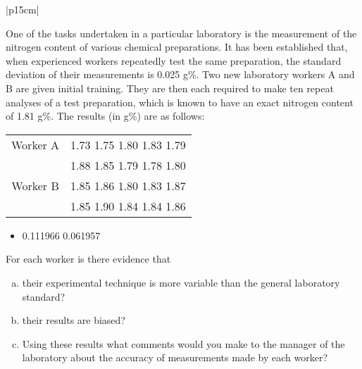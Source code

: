 \documentclass[a4paper,12pt]{article}
\begin{document}
\begin{table}[ht!]
 
\centering
 
\begin{tabular}{|p{15cm}|}
 
\hline  

\large
\noindent One of the tasks undertaken in a particular laboratory is the measurement of the nitrogen content of various chemical preparations.  
It has been established that, when experienced workers repeatedly test the same preparation, the standard deviation of their measurements is 0.025 g\%.
Two new laboratory workers A and B are given initial training.  They are then each required to make ten repeat 
analyses of a test preparation, which is known to have an exact nitrogen content of 1.81 g\%.  The results (in g\%) are as follows:






\begin{center}
\begin{tabular}{|c|c|} \hline
Worker A &  1.73 1.75 1.80 1.83 1.79  \\&  1.88 1.85 1.79 1.78 1.80\\ \hline
Worker B&  1.85 1.86 1.80 1.83 1.87  \\&  1.85 1.90 1.84 1.84 1.86\\ \hline
\end{tabular}
\end{center}
\begin{itemize}
    \item 0.111966
0.061957
\end{itemize}


For each worker is there evidence that
\begin{enumerate}[(a)]
    \item their experimental technique is more variable than the general laboratory standard?
  \item their results are biased?
  \item 
Using these results what comments would you make to the manager of the laboratory about the accuracy of measurements made by each worker?
\end{enumerate}

\\ \hline
  
\end{tabular}

\end{table}
\end{document}

